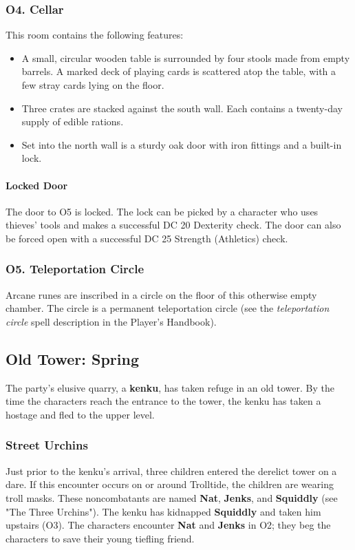 \documentclass[10pt,a4paper,twoside,twocolumn,openany,nodeprecatedcode]{dndbook}
\begin{document}
\subsubsection{O4. Cellar}
This room contains the following features:
\begin{itemize}

\item A small, circular wooden table is surrounded by four stools made from empty barrels. A marked deck of playing cards is scattered atop the table, with a few stray cards lying on the floor.
\item Three crates are stacked against the south wall. Each contains a twenty-day supply of edible rations.
\item Set into the north wall is a sturdy oak door with iron fittings and a built-in lock.
\end{itemize}


\paragraph{Locked Door}
The door to O5 is locked. The lock can be picked by a character who uses thieves' tools and makes a successful DC 20 Dexterity check. The door can also be forced open with a successful DC 25 Strength (Athletics) check.
\subsubsection{O5. Teleportation Circle}
Arcane runes are inscribed in a circle on the floor of this otherwise empty chamber. The circle is a permanent teleportation circle (see the \textit{teleportation circle} spell description in the Player's Handbook).
\subsection{Old Tower: Spring}
The party's elusive quarry, a \textbf{kenku}, has taken refuge in an old tower. By the time the characters reach the entrance to the tower, the kenku has taken a hostage and fled to the upper level.
\subsubsection{Street Urchins}
Just prior to the kenku's arrival, three children entered the derelict tower on a dare. If this encounter occurs on or around Trolltide, the children are wearing troll masks. These noncombatants are named \textbf{Nat}, \textbf{Jenks}, and \textbf{Squiddly} (see "The Three Urchins").
The kenku has kidnapped \textbf{Squiddly} and taken him upstairs (O3). The characters encounter \textbf{Nat} and \textbf{Jenks} in O2; they beg the characters to save their young tiefling friend.
\end{document}
